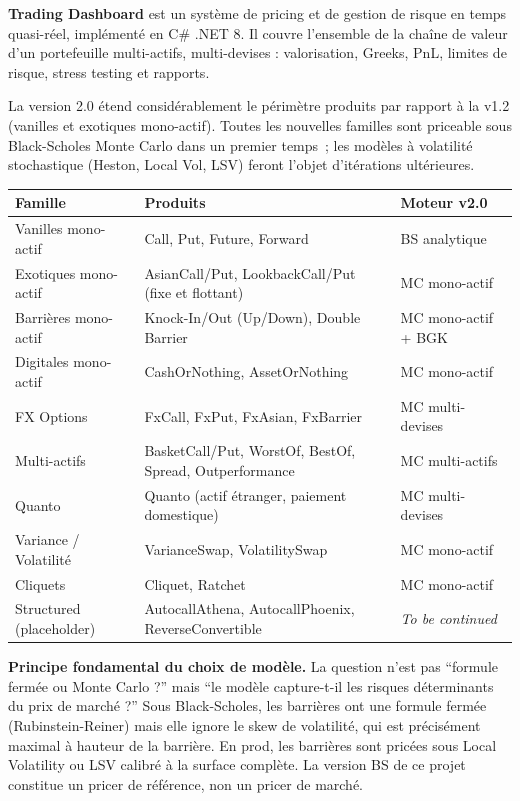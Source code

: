 \documentclass[a4paper,11pt]{article}
\begin{document}
\textbf{Trading Dashboard} est un syst\`eme de pricing et de gestion de risque en temps
quasi-r\'eel, impl\'ement\'e en C\# .NET 8. Il couvre l'ensemble de la cha\^ine de valeur
d'un portefeuille multi-actifs, multi-devises : valorisation, Greeks, PnL, limites
de risque, stress testing et rapports.

La version 2.0 \'etend consid\'erablement le p\'erim\`etre produits par rapport \`a la v1.2
(vanilles et exotiques mono-actif). Toutes les nouvelles familles sont priceable sous
Black-Scholes Monte Carlo dans un premier temps~; les mod\`eles \`a volatilit\'e stochastique
(Heston, Local Vol, LSV) feront l'objet d'it\'erations ult\'erieures.

\begin{center}
\begin{tabularx}{\textwidth}{l X l}
\toprule
\textbf{Famille} & \textbf{Produits} & \textbf{Moteur v2.0} \\
\midrule
Vanilles mono-actif & Call, Put, Future, Forward & BS analytique \\
Exotiques mono-actif & AsianCall/Put, LookbackCall/Put (fixe et flottant) & MC mono-actif \\
Barrières mono-actif & Knock-In/Out (Up/Down), Double Barrier & MC mono-actif + BGK \\
Digitales mono-actif & CashOrNothing, AssetOrNothing & MC mono-actif \\
FX Options & FxCall, FxPut, FxAsian, FxBarrier & MC multi-devises \\
Multi-actifs & BasketCall/Put, WorstOf, BestOf, Spread, Outperformance & MC multi-actifs \\
Quanto & Quanto (actif \'etranger, paiement domestique) & MC multi-devises \\
Variance / Volatilit\'e & VarianceSwap, VolatilitySwap & MC mono-actif \\
Cliquets & Cliquet, Ratchet & MC mono-actif \\
Structured (placeholder) & AutocallAthena, AutocallPhoenix, ReverseConvertible & \textit{To be continued} \\
\bottomrule
\end{tabularx}
\end{center}

\begin{tcolorbox}[note]
\textbf{Principe fondamental du choix de mod\`ele.} La question n'est pas
``formule ferm\'ee ou Monte Carlo ?'' mais ``le mod\`ele capture-t-il les risques
d\'eterminants du prix de march\'e ?'' Sous Black-Scholes, les barrières ont une
formule ferm\'ee (Rubinstein-Reiner) mais elle ignore le skew de volatilit\'e, qui
est pr\'ecis\'ement maximal \`a hauteur de la barri\`ere. En prod, les barrières sont
pric\'ees sous Local Volatility ou LSV calibr\'e \`a la surface compl\`ete. La version BS
de ce projet constitue un pricer de r\'ef\'erence, non un pricer de march\'e.
\end{tcolorbox}
\end{document}
